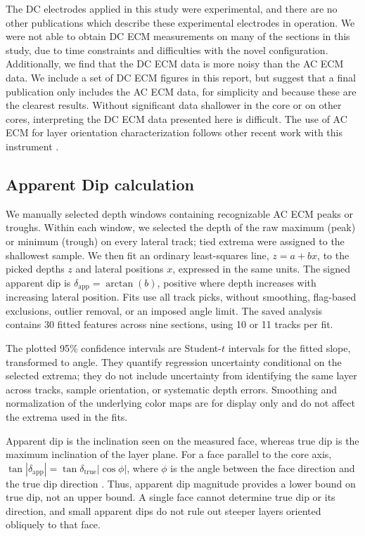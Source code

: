 \documentclass[11pt,letterpaper]{article}
\begin{document}
The DC electrodes applied in this study were experimental, and there are no other publications which describe these experimental electrodes in operation. We were not able to obtain DC ECM measurements on many of the sections in this study, due to time constraints and difficulties with the novel configuration. Additionally, we find that the DC ECM data is more noisy than the AC ECM data. We include a set of DC ECM figures in this report, but suggest that a final publication only includes the AC ECM data, for simplicity and because these are the clearest results. Without significant data shallower in the core or on other cores, interpreting the DC ECM data presented here is difficult. The use of AC ECM for layer orientation characterization follows other recent work with this instrument \parencite{kirkpatrick_three-dimensional_2025}.

\subsection{Apparent Dip calculation}

We manually selected depth windows containing recognizable AC ECM peaks or troughs. Within each window, we selected the depth of the raw maximum (peak) or minimum (trough) on every lateral track; tied extrema were assigned to the shallowest sample. We then fit an ordinary least-squares line, $z=a+bx$, to the picked depths $z$ and lateral positions $x$, expressed in the same units. The signed apparent dip is $\delta_{\mathrm{app}}=\arctan(b)$, positive where depth increases with increasing lateral position. Fits use all track picks, without smoothing, flag-based exclusions, outlier removal, or an imposed angle limit. The saved analysis contains 30 fitted features across nine sections, using 10 or 11 tracks per fit.

The plotted 95\% confidence intervals are Student-$t$ intervals for the fitted slope, transformed to angle. They quantify regression uncertainty conditional on the selected extrema; they do not include uncertainty from identifying the same layer across tracks, sample orientation, or systematic depth errors. Smoothing and normalization of the underlying color maps are for display only and do not affect the extrema used in the fits.

Apparent dip is the inclination seen on the measured face, whereas true dip is the maximum inclination of the layer plane. For a face parallel to the core axis, $\tan|\delta_{\mathrm{app}}|=\tan\delta_{\mathrm{true}}|\cos\phi|$, where $\phi$ is the angle between the face direction and the true dip direction \parencite{kirkpatrick_three-dimensional_2025}. Thus, apparent dip magnitude provides a lower bound on true dip, not an upper bound. A single face cannot determine true dip or its direction, and small apparent dips do not rule out steeper layers oriented obliquely to that face.
\end{document}
